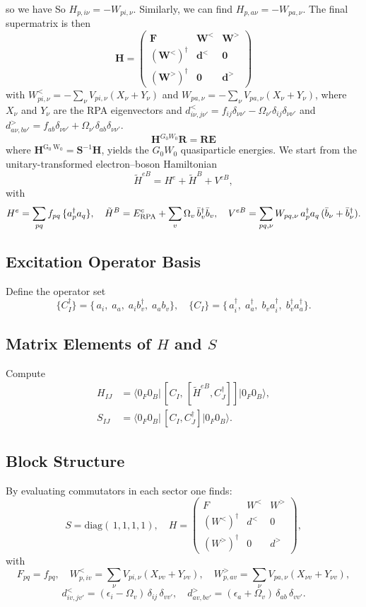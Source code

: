  so we have
So $H_{p,i \nu} = -W_{p i, \nu}$. Similarly, we can find $H_{p,a \nu} = -W_{p a, \nu}$. The final supermatrix is then
\begin{equation}
\bm{H} = \begin{pmatrix}
    \bm{F} & \bm{W}^< & \bm{W}^> \\
    (\bm{W}^<)^\dagger & \bm{d}^< & \bm{0} \\
    (\bm{W}^>)^\dagger & \bm{0} & \bm{d}^>
\end{pmatrix}
\end{equation}
with $W_{p i, \nu}^< = -\sum_\nu V_{p i, \nu} (X_{\nu} + Y_{\nu})$ and $W_{p a, \nu} = -\sum_\nu V_{p a, \nu} (X_{\nu} + Y_{\nu})$, where $X_{\nu}$ and $Y_{\nu}$ are the RPA eigenvectors and $d^<_{i \nu, j \nu'} = f_{i j} \delta_{\nu \nu'} - \Omega_{\nu'} \delta_{i j} \delta_{\nu \nu'}$ and $d^>_{a \nu, b \nu'} = f_{a b} \delta_{\nu \nu'} + \Omega_{\nu'} \delta_{a b} \delta_{\nu \nu'}$.
$$
\mathbf{H}^{G_0 W_0} \mathbf{R}=\mathbf{R} \mathbf{E}
$$
where $\mathbf{H}^{\mathrm{G}_0 \mathrm{~W}_0}=\mathbf{S}^{-1} \mathbf{H}$, yields the $G_0 W_0$ quasiparticle energies. 
We start from the unitary-transformed electron–boson Hamiltonian
\[
\tilde H^{eB}=H^e+\tilde H^B+V^{eB},
\]
with
\[
H^e=\sum_{pq}f_{pq}\,\{a_p^\dagger a_q\},
\quad
\tilde H^B=E^c_{\rm RPA}+\sum_v\Omega_v\,\bar b_v^\dagger\bar b_v,
\quad
V^{eB}=\sum_{pq,\nu}W_{pq,\nu}\,a_p^\dagger a_q\,(\bar b_\nu+\bar b_\nu^\dagger).
\]

\subsection*{Excitation Operator Basis}
Define the operator set
\[
\{C_I^\dagger\}=
\{\,a_i,\;a_a,\;a_i b_v^\dagger,\;a_a b_v\},
\quad
\{C_I\}=
\{\,a_i^\dagger,\;a_a^\dagger,\;b_v a_i^\dagger,\;b_v^\dagger a_a^\dagger\}.
\]

\subsection*{Matrix Elements of $H$ and $S$}
Compute
\begin{align*}
H_{IJ}&=\bigl\langle0_F0_B\bigl|\,[C_I,\,[\tilde H^{eB},C_J^\dagger]]\bigr|0_F0_B\bigr\rangle,\\
S_{IJ}&=\bigl\langle0_F0_B\bigl|\,[C_I,C_J^\dagger]\bigr|0_F0_B\bigr\rangle.
\end{align*}

\subsection*{Block Structure}
By evaluating commutators in each sector one finds:
\[
S=\mathrm{diag}(\,1,1,1,1),
\quad
H=\begin{pmatrix}
F & W^< & W^>\\
(W^<)^\dagger & d^< & 0\\
(W^>)^\dagger & 0 & d^>
\end{pmatrix},
\]
with
\[
F_{pq}=f_{pq},
\quad
W^<_{p,i v} = \sum_\nu V_{pi,\nu}(X_{\nu v}+Y_{\nu v}),
\quad
W^>_{p,a v}=\sum_\nu V_{pa,\nu}(X_{\nu v}+Y_{\nu v}),
\]
\[
d^<_{i v,j v'}=(\epsilon_i-\Omega_v)\,\delta_{ij}\,\delta_{vv'},
\quad
d^>_{a v,b v'}=(\epsilon_a+\Omega_v)\,\delta_{ab}\,\delta_{vv'}.
\]

